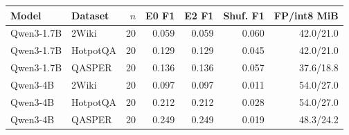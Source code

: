 \begin{tabular}{llrrrrr}
\toprule
Model & Dataset & $n$ & E0 F1 & E2 F1 & Shuf. F1 & FP/int8 MiB \\
\midrule
Qwen3-1.7B & 2Wiki & 20 & 0.059 & 0.059 & 0.060 & 42.0/21.0 \\
Qwen3-1.7B & HotpotQA & 20 & 0.129 & 0.129 & 0.045 & 42.0/21.0 \\
Qwen3-1.7B & QASPER & 20 & 0.136 & 0.136 & 0.057 & 37.6/18.8 \\
Qwen3-4B & 2Wiki & 20 & 0.097 & 0.097 & 0.011 & 54.0/27.0 \\
Qwen3-4B & HotpotQA & 20 & 0.212 & 0.212 & 0.028 & 54.0/27.0 \\
Qwen3-4B & QASPER & 20 & 0.249 & 0.249 & 0.019 & 48.3/24.2 \\
\bottomrule
\end{tabular}
